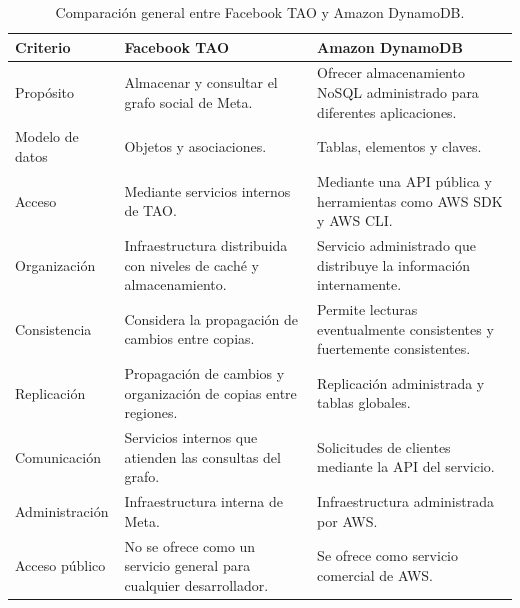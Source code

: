 \documentclass[12pt,a4paper]{article}
\begin{document}
\begin{table}[H]
\centering
\small
\caption{Comparación general entre Facebook TAO y Amazon DynamoDB.}
\label{tab:comparacion}
\begin{tabular}{p{2.8cm}p{5.5cm}p{5.5cm}}
\toprule
\textbf{Criterio} &
\textbf{Facebook TAO} &
\textbf{Amazon DynamoDB} \\
\midrule

Propósito &
Almacenar y consultar el grafo social de Meta. &
Ofrecer almacenamiento NoSQL administrado para diferentes aplicaciones. \\

\midrule

Modelo de datos &
Objetos y asociaciones. &
Tablas, elementos y claves. \\

\midrule

Acceso &
Mediante servicios internos de TAO. &
Mediante una API pública y herramientas como AWS SDK y AWS CLI. \\

\midrule

Organización &
Infraestructura distribuida con niveles de caché y almacenamiento. &
Servicio administrado que distribuye la información internamente. \\

\midrule

Consistencia &
Considera la propagación de cambios entre copias. &
Permite lecturas eventualmente consistentes y fuertemente consistentes. \\

\midrule

Replicación &
Propagación de cambios y organización de copias entre regiones. &
Replicación administrada y tablas globales. \\

\midrule

Comunicación &
Servicios internos que atienden las consultas del grafo. &
Solicitudes de clientes mediante la API del servicio. \\

\midrule

Administración &
Infraestructura interna de Meta. &
Infraestructura administrada por AWS. \\

\midrule

Acceso público &
No se ofrece como un servicio general para cualquier desarrollador. &
Se ofrece como servicio comercial de AWS. \\

\bottomrule
\end{tabular}
\end{table}
\end{document}
